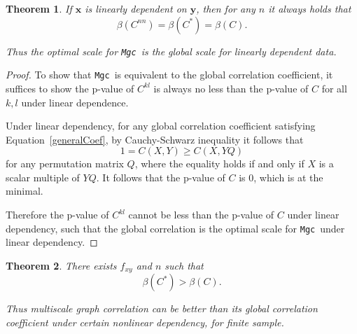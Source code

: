 \documentclass[11pt]{article}
\providecommand{\sct}[1]{{\sc \texttt{#1}}}
\providecommand{\mb}[1]{\boldsymbol{#1}}
\newcommand{\G}{C}
\newcommand{\Mgc}{\sct{Mgc}}
\newtheorem{appThm}{Theorem}
\begin{document}
\begin{appThm}
\label{at:linear}
If $\mb{x}$ is linearly dependent on $\mb{y}$, then for any $n$ it always holds that
\begin{equation}
\beta(\G^{nn}) = \beta(\G^{*}) = \beta(\G).
\end{equation}

Thus the optimal scale for \Mgc~is the global scale for linearly dependent data.
\end{appThm}

\begin{proof}
To show that \Mgc~is equivalent to the global correlation coefficient, it suffices to show the p-value of $\G^{kl}$ is always no less than the p-value of $\G$ for all $k,l$ under linear dependence.

Under linear dependency, for any global correlation coefficient satisfying Equation~\ref{generalCoef}, by Cauchy-Schwarz inequality it follows that
\begin{equation}
1=\G(X, Y) \geq \G(X, YQ)
\end{equation}
for any permutation matrix $Q$, where the equality holds if and only if $X$ is a scalar multiple of $YQ$. It follows that the p-value of $\G$ is $0$, which is at the minimal.

Therefore the p-value of $\G^{kl}$ cannot be less than the p-value of $\G$ under linear dependency, such that the global correlation is the optimal scale for \Mgc~under linear dependency.
\end{proof}


\begin{appThm}
There exists $f_{xy}$ and $n$ such that
\begin{equation}
\beta(\G^{*}) > \beta(\G).
\end{equation}

Thus multiscale graph correlation can be better than its global correlation coefficient under certain nonlinear dependency, for finite sample.
\end{appThm}
\end{document}
